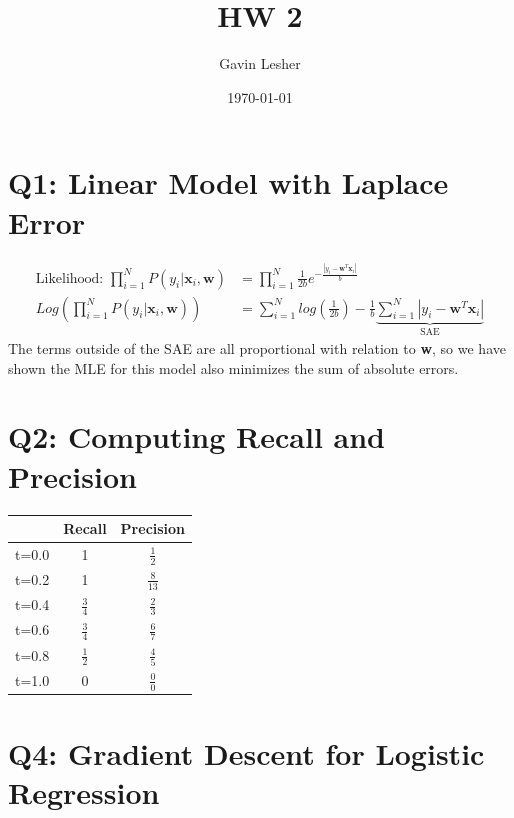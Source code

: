 \documentclass{article}
\title{HW 2}
\author{Gavin Lesher}
\date{\today}
\begin{document}
    \maketitle
    \clearpage

    \section*{Q1: Linear Model with Laplace Error}

        \begin{align*}
            \text{Likelihood: }\prod_{i=1}^N P(y_i | \textbf{x}_i, \textbf{w}) &= 
                \prod_{i=1}^N \frac{1}{2b}e^{-\frac{|y_i-\textbf{w}^T\textbf{x}_i|}{b}}\\
             Log\left(\prod_{i=1}^N P(y_i | \textbf{x}_i, \textbf{w})\right)&= 
             \sum_{i=1}^N log\left(\frac{1}{2b}\right) - \frac{1}{b}\underbrace{\sum_{i=1}^N |y_i - \textbf{w}^T \textbf{x}_i|}_\text{SAE}
        \end{align*}
        The terms outside of the SAE are all proportional with relation to \textbf{w}, so we have shown the MLE for this model also minimizes the sum of absolute errors.

    \section*{Q2: Computing Recall and Precision}
        \begin{center}
            \begin{tabular}{| c | c | c |}
                \hline
                    & Recall & Precision \\[1ex]
                \hline
                t=0.0 & 1 & $\frac{1}{2}$ \\[1ex]
                t=0.2 & 1 & $\frac{8}{13}$ \\[1ex]
                t=0.4 & $\frac{3}{4}$ & $\frac{2}{3}$ \\[1ex]
                t=0.6 & $\frac{3}{4}$ & $\frac{6}{7}$ \\[1ex]
                t=0.8 & $\frac{1}{2}$ & $\frac{4}{5}$ \\[1ex]
                t=1.0 & 0 & $\frac{0}{0}$\\[1ex]
                \hline

            \end{tabular}
        \end{center}

    \section*{Q4: Gradient Descent for Logistic Regression}
\end{document}
